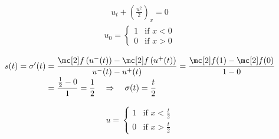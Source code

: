 \begin{examplebox}\nospacing
    \begin{example}\label{example:rk_for_riemann_problem}
        \leavevmode\\
        \begin{minipage}{0.4\textwidth}
            \begin{align}
            u_{t}+\left(\frac{u^{2}}{2}\right)_{x}=0
            \end{align}
            \begin{align}
            u_{0}=\begin{cases}
                    1&\text{if }x<0\\
                    0&\text{if }x>0
                    \end{cases}
            \label{eq:riemann_problem}
            \end{align}
        \end{minipage}\hfil
        \begin{minipage}[c]{0.4\textwidth}
            \begin{figure}[H]
                \centering{
                  \def\svgwidth{100pt}
                  \resizebox{\linewidth}{!}{}
                }
            \end{figure}
        \end{minipage}
        \begin{align*}
          s(t)=\sigma'(t)&=\frac{\flux \left(u^{-}(t)\right)-\flux \left(u^{+}(t)\right)}{
          u^{-}(t)-u^{+}(t)
          }=\frac{\flux(1)-\flux(0)}{1-0}\\[-1\jot]
          &=\frac{\frac{1}{2}-0}{1}=\frac{1}{2}\quad\Rightarrow\quad\sigma(t)=\frac{t}{2}
        \end{align*}
        \begin{minipage}[c]{0.55\textwidth}
            \begin{align}
            u=\begin{cases}
                    1&\text{if }x<\frac{t}{2}\\
                    0&\text{if }x>\frac{t}{2}
                    \end{cases}
            \label{eq:riemann_problem}
            \end{align}
        \end{minipage}
        \vspace{-1em}
        \begin{minipage}{0.3\textwidth}

\end{minipage}
\end{example}
\end{examplebox}
